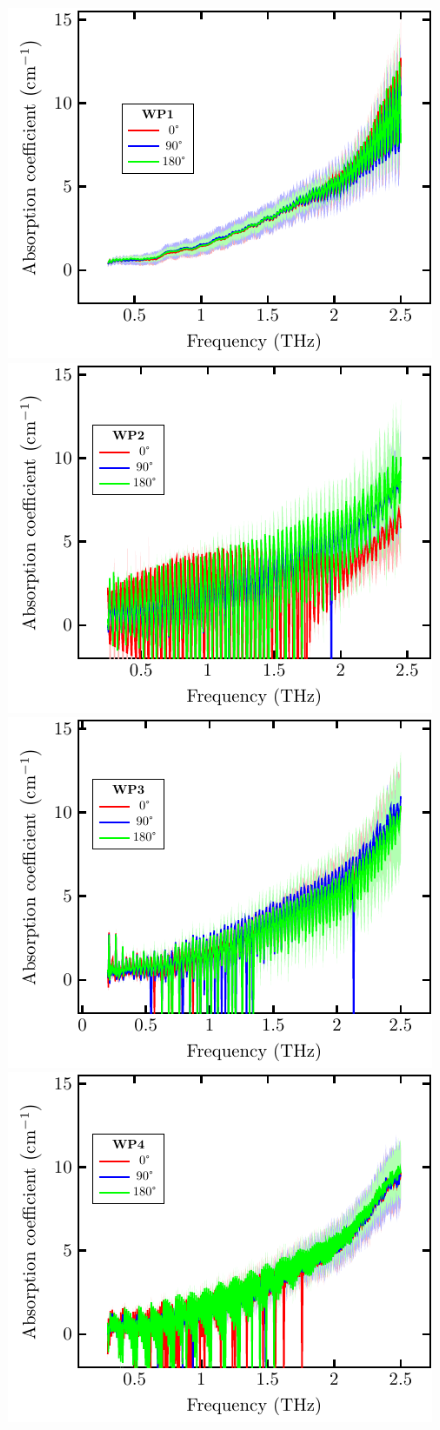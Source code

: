 \begin{figure}[H]
\centering
\subcaptionbox{\label{fig:ceramic_WP1_abs}}
    {\hspace*{-2em}\includegraphics[width=0.45\linewidth]{images/appendix/plots/real_abs/WP1.pdf}}
\qquad
\subcaptionbox{\label{fig:ceramic_WP2_abs}}
    {\hspace*{-2em}\includegraphics[width=0.45\linewidth]{images/appendix/plots/real_abs/WP2.pdf}}
\subcaptionbox{\label{fig:ceramic_WP3_abs}}
    {\hspace*{-2em}\includegraphics[width=0.45\linewidth]{images/appendix/plots/real_abs/WP3.pdf}}
\qquad
\subcaptionbox{\label{fig:ceramic_WP4_abs}}
    {\hspace*{-2em}\includegraphics[width=0.45\linewidth]{images/appendix/plots/real_abs/WP4.pdf}}

\end{figure}
